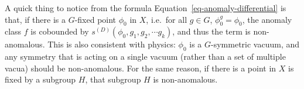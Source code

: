 \documentclass[
  letterpaper,
  DIV=11,
  numbers=noendperiod]{scrreport}
\begin{document}
\begin{tcolorbox}[enhanced jigsaw, opacityback=0, opacitybacktitle=0.6, leftrule=.75mm, arc=.35mm, coltitle=black, breakable, colframe=quarto-callout-note-color-frame, titlerule=0mm, colback=white, bottomrule=.15mm, left=2mm, colbacktitle=quarto-callout-note-color!10!white, toptitle=1mm, bottomtitle=1mm, title=\textcolor{quarto-callout-note-color}{\faInfo}\hspace{0.5em}{A \(G\)-fixed point indicates anomaly-free.}, rightrule=.15mm, toprule=.15mm]

A quick thing to notice from the formula
Equation~\ref{eq-anomaly-differential} is that, if there is a
\(G\)-fixed point \(\phi_0\) in \(X\), i.e.~for all \(g\in G\),
\(\phi^g_0 = \phi_0\), the anomaly class \(f\) is cobounded by
\(s^{(D)}(\phi_0,g_1,g_2,\cdots g_k)\), and thus the term is
non-anomalous. This is also consistent with physics: \(\phi_0\) is a
\(G\)-symmetric vacuum, and any symmetry that is acting on a single
vacuum (rather than a set of multiple vacua) should be non-anomalous.
For the same reason, if there is a point in \(X\) is fixed by a subgroup
\(H\), that subgroup \(H\) is non-anomalous.

\end{tcolorbox}
\end{document}
